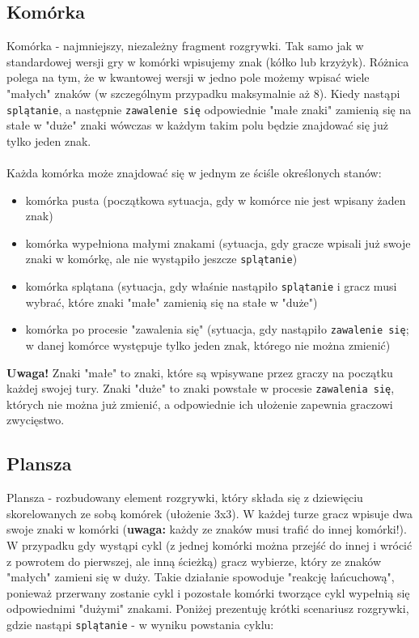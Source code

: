 \documentclass{article}
\begin{document}
\subsection{Komórka}
Komórka - najmniejszy, niezależny fragment rozgrywki. Tak samo jak w standardowej wersji gry w komórki wpisujemy znak (kółko lub krzyżyk). Różnica polega na tym, że w kwantowej wersji w jedno pole możemy wpisać wiele "małych" znaków (w szczególnym przypadku maksymalnie aż 8). Kiedy nastąpi \texttt{splątanie}, a następnie \texttt{zawalenie się} odpowiednie "małe znaki" zamienią się na stałe w "duże" znaki wówczas w każdym takim polu będzie znajdować się już tylko jeden znak.\\ \\

Każda komórka może znajdować się w jednym ze ściśle określonych stanów:
\begin{itemize}
    \item komórka pusta (początkowa sytuacja, gdy w komórce nie jest wpisany żaden znak)
    \item komórka wypełniona małymi znakami (sytuacja, gdy gracze wpisali już swoje znaki w komórkę, ale nie wystąpiło jeszcze \texttt{splątanie})
    \item komórka splątana (sytuacja, gdy właśnie nastąpiło \texttt{splątanie} i gracz musi wybrać, które znaki "małe" zamienią się na stałe w "duże")
    \item komórka po procesie "zawalenia się" (sytuacja, gdy nastąpiło \texttt{zawalenie się}; w danej komórce występuje tylko jeden znak, którego nie można zmienić)
\end{itemize}

\textbf{Uwaga!} Znaki "małe" to znaki, które są wpisywane przez graczy na początku każdej swojej tury. Znaki "duże" to znaki powstałe w procesie \texttt{zawalenia się}, których nie można już zmienić, a odpowiednie ich ułożenie zapewnia graczowi zwycięstwo.

\subsection{Plansza}
Plansza - rozbudowany element rozgrywki, który składa się z dziewięciu skorelowanych ze sobą komórek (ułożenie 3x3). W każdej turze gracz wpisuje dwa swoje znaki w komórki (\textbf{uwaga:} każdy ze znaków musi trafić do innej komórki!). W przypadku gdy wystąpi cykl (z jednej komórki można przejść do innej i wrócić z powrotem do pierwszej, ale inną ścieżką) gracz wybierze, który ze znaków "małych" zamieni się w duży. Takie działanie spowoduje "reakcję łańcuchową", ponieważ przerwany zostanie cykl i pozostałe komórki tworzące cykl wypełnią się odpowiednimi "dużymi" znakami. Poniżej prezentuję krótki scenariusz rozgrywki, gdzie nastąpi \texttt{splątanie} - w wyniku powstania cyklu:\\
\end{document}

